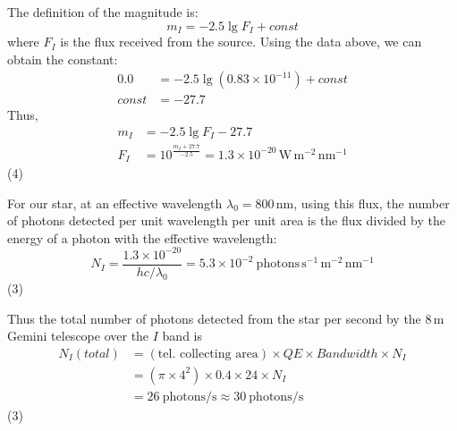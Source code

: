 The definition of the magnitude is:
\[
m_I = -2.5\lg F_I + const
\]
where $F_I$ is the flux received from the source. Using the data above, we can
obtain the constant:
\begin{align*}
0.0 &= -2.5\lg(0.83 \times 10^{-11}) + const\\
const &= -27.7
\end{align*}
Thus,
\begin{align*}
m_I &= -2.5\lg F_I - 27.7\\
F_I &= 10^{\frac{m_I + 27.7}{-2.5}}
  = 1.3 \times 10^{-20}\,\mathrm{W\,m^{-2}\,nm^{-1}}
\end{align*}
\hfill(4)

For our star, at an effective wavelength $\lambda_0 = 800$\,nm, using this
flux, the number of photons detected per unit wavelength per unit area is the
flux divided by the energy of a photon with the effective wavelength:
\[
N_I = \frac{1.3 \times 10^{-20}}{hc/\lambda_0}
 = 5.3 \times 10^{-2}\ \mathrm{photons\,s^{-1}\,m^{-2}\,nm^{-1}}
\]
\hfill(3)

Thus the total number of photons detected from the star per second by the 8\,m
Gemini telescope over the $I$ band is
\begin{align*}
N_I(total) &= (\text{tel.\ collecting area}) \times QE
  \times Bandwidth \times N_I\\
&= (\pi \times 4^2) \times 0.4 \times 24 \times N_I\\
&= 26\ \mathrm{photons/s} \approx 30\ \mathrm{photons/s}
\end{align*}
\hfill(3)

